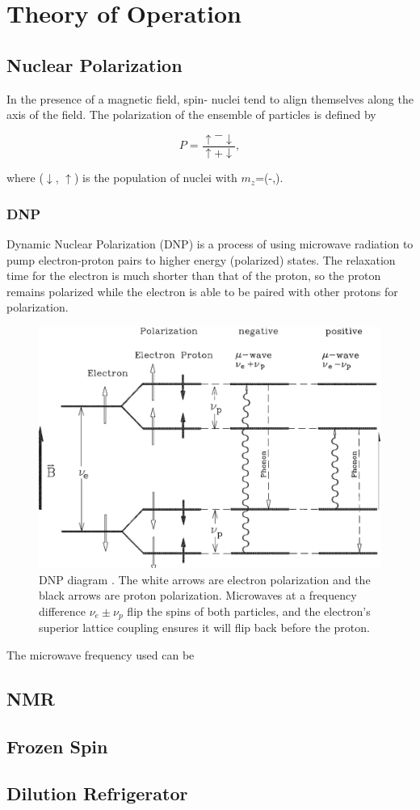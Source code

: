 \chapter{Theory of Operation} 
\label{theory}  
\section{Nuclear Polarization}
In the presence of a magnetic field, spin-\half{} nuclei tend to align themselves along the axis of the field.  The polarization of the ensemble of particles is defined by 

$$P=\frac{\uparrow-\downarrow}{\uparrow+\downarrow},$$

where ($\downarrow$, $\uparrow$) is the population of nuclei with $m_z$=(-\half,\half).
 \subsection{DNP}
Dynamic Nuclear Polarization (DNP) is a process of using microwave radiation to pump electron-proton pairs to higher energy (polarized) states.  The relaxation time for the electron is much shorter than that of the proton, so the proton remains polarized while the electron is able to be paired with other protons for polarization.

\begin{figure}
 \centering
 \includegraphics[scale=.25]{img/dnp.png}
 \caption{DNP diagram \cite{dnpdiagram}.  The white arrows are electron polarization and the black arrows are proton polarization.  Microwaves at a frequency difference $\nu_e\pm\nu_p$ flip the spins of both particles, and the electron's superior lattice coupling ensures it will flip back before the proton.}
 \label{fig:dnp-diagram}
\end{figure}


The microwave frequency used can be 
\section{NMR}

\section{Frozen Spin} 
 
\section{Dilution Refrigerator} 

